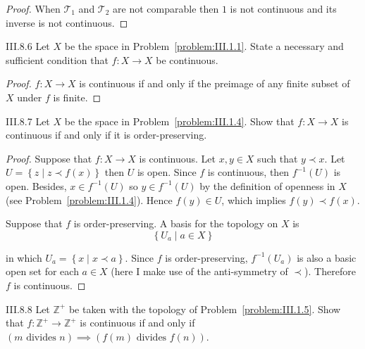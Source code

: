 \begin{proof}
    When \( \mathscr{T}_{1} \) and \( \mathscr{T}_{2} \) are not comparable then \( 1 \) is not continuous and its inverse is not continuous.
\end{proof}

\begin{problem}{III.8.6}
Let \( X \) be the space in Problem~\ref{problem:III.1.1}. State a necessary and sufficient condition that \( f: X \to X \) be continuous.
\end{problem}

\begin{proof}
    \( f: X \to X \) is continuous if and only if the preimage of any finite subset of \(X\) under \(f\) is finite.
\end{proof}

\begin{problem}{III.8.7}\label{problem:III.8.7}
Let \( X \) be the space in Problem~\ref{problem:III.1.4}. Show that \( f: X \to X \) is continuous if and only if it is order-preserving.
\end{problem}

\begin{proof}
    Suppose that \( f: X \to X \) is continuous. Let \( x, y \in X \) such that \( y \prec x \). Let \( U = \left\{ z \mid z \prec f(x) \right\} \) then \( U \) is open. Since \( f \) is continuous, then \( f^{-1}(U) \) is open. Besides, \( x \in f^{-1}(U) \) so \( y \in f^{-1}(U) \) by the definition of openness in \( X \) (see Problem~\ref{problem:III.1.4}). Hence \( f(y) \in U \), which implies \( f(y) \prec f(x) \).

    Suppose that \( f \) is order-preserving. A basis for the topology on \( X \) is
    \[
        \left\{ U_{a} \mid a \in X \right\}
    \]

    in which \( U_{a} = \left\{ x \mid x \prec a \right\} \). Since \( f \) is order-preserving, \( f^{-1}(U_{a}) \) is also a basic open set for each \( a \in X \) (here I make use of the anti-symmetry of \( \prec \)). Therefore \( f \) is continuous.
\end{proof}

\begin{problem}{III.8.8}
Let \( \mathbb{Z}^{+} \) be taken with the topology of Problem~\ref{problem:III.1.5}. Show that \( f: \mathbb{Z}^{+} \to \mathbb{Z}^{+} \) is continuous if and only if \( (m \text{ divides } n) \implies (f(m) \text{ divides } f(n)) \).
\end{problem}

